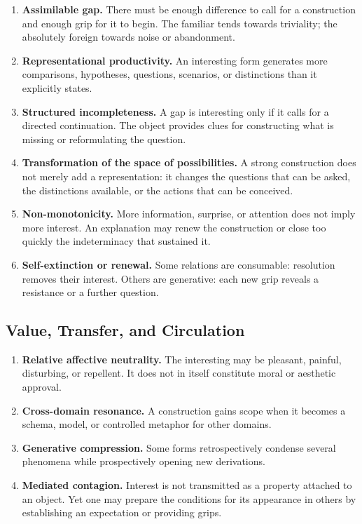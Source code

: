 \documentclass[11pt,a4paper]{article}
\begin{document}
\begin{enumerate}[resume]
  \item \textbf{Assimilable gap.} There must be enough difference to call for a
        construction and enough grip for it to begin. The familiar tends
        towards triviality; the absolutely foreign towards noise or
        abandonment.
  \item \textbf{Representational productivity.} An interesting form generates
        more comparisons, hypotheses, questions, scenarios, or distinctions
        than it explicitly states.
  \item \textbf{Structured incompleteness.} A gap is interesting only if it
        calls for a directed continuation. The object provides clues for
        constructing what is missing or reformulating the question.
  \item \textbf{Transformation of the space of possibilities.} A strong
        construction does not merely add a representation: it changes the
        questions that can be asked, the distinctions available, or the actions
        that can be conceived.
  \item \textbf{Non-monotonicity.} More information, surprise, or attention does
        not imply more interest. An explanation may renew the construction or
        close too quickly the indeterminacy that sustained it.
  \item \textbf{Self-extinction or renewal.} Some relations are consumable:
        resolution removes their interest. Others are generative: each new grip
        reveals a resistance or a further question.
\end{enumerate}

\subsection{Value, Transfer, and Circulation}

\begin{enumerate}[resume]
  \item \textbf{Relative affective neutrality.} The interesting may be
        pleasant, painful, disturbing, or repellent. It does not in itself
        constitute moral or aesthetic approval.
  \item \textbf{Cross-domain resonance.} A construction gains scope when it
        becomes a schema, model, or controlled metaphor for other domains.
  \item \textbf{Generative compression.} Some forms retrospectively condense
        several phenomena while prospectively opening new derivations.
  \item \textbf{Mediated contagion.} Interest is not transmitted as a property
        attached to an object. Yet one may prepare the conditions for its
        appearance in others by establishing an expectation or providing
        grips.
\end{enumerate}
\end{document}
